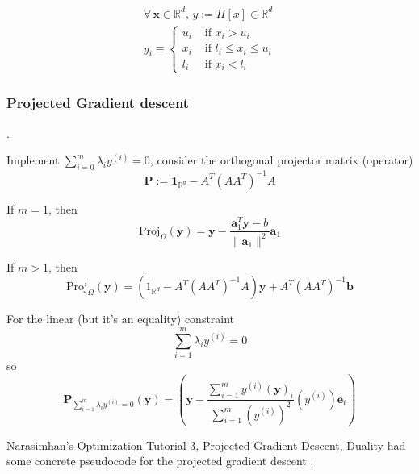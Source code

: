 \documentclass[10pt]{amsart}
\begin{document}
\begin{multicols*}{2}
\[
\begin{gathered}
  \forall \, \mathbf{x} \in \mathbb{R}^d, \, y := \Pi[x] \in \mathbb{R}^d \\ 
  y_i \equiv \begin{cases} u_i & \text{ if } x_i > u_i \\
    x_i & \text{ if } l_i \leq x_i \leq u_i \\
    l_i & \text{ if } x_i < l_i \end{cases}
  \end{gathered}
\]







\subsubsection{Projected Gradient descent}.

Implement $\sum_{i=0}^m \lambda_i y^{(i)} = 0$, consider the orthogonal projector matrix (operator)
\begin{equation}
  \mathbf{P} := \mathbf{1}_{\mathbb{R}^d} - A^T(AA^T)^{-1}A
  \end{equation}





If $m=1$, then
\[
\text{Proj}_{\Omega}(\mathbf{y}) = \mathbf{y} - \frac{\mathbf{a}_1^T \mathbf{y} - b}{ \| \mathbf{a}_1 \|^2 } \mathbf{a}_1
\]

If $m>1$, then
\[
\text{Proj}_{\Omega}(\mathbf{y}) = (1_{\mathbb{R}^d} - A^T(AA^T)^{-1}A)\mathbf{y}+A^T(AA^T)^{-1}\mathbf{b}
\]

For the linear (but it's an equality) constraint
\[
\sum_{i=1}^m \lambda_iy^{(i)} = 0 
\]
so
\begin{equation}
  \mathbf{P}_{\sum_{i=1}^m\lambda_iy^{(i)} = 0 }(\mathbf{y}) = \left( \mathbf{y} - \frac{ \sum_{i=1}^m y^{(i)} (\mathbf{y})_i }{ \sum_{i=1}^m (y^{(i)})^2 } (y^{(i)})\mathbf{e}_i \right)
  \end{equation}


\href{http://drona.csa.iisc.ernet.in/~e0270/Jan-2015/Tutorials/lecture-notes-3.pdf}{Narasimhan's Optimization Tutorial 3, Projected Gradient Descent, Duality} had some concrete pseudocode for the projected gradient descent \cite{Nara2015}.


\end{multicols*}
\end{document}
